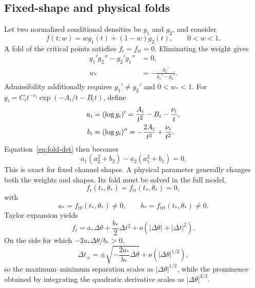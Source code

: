 \documentclass[aps,pre,reprint,amsmath,amssymb,longbibliography,floatfix]{revtex4-2}
\begin{document}
\subsection{Fixed-shape and physical folds}
\label{sec:fold}

Let two normalized conditional densities be \(g_1\) and \(g_2\), and consider
\begin{equation}
f(t;w)=w g_1(t)+(1-w)g_2(t),\qquad 0<w<1.
\label{eq:mixture}
\end{equation}
A fold of the critical points satisfies \(f_t=f_{tt}=0\). Eliminating the
weight gives
\begin{align}
g_1'g_2''-g_2'g_1''&=0,
\label{eq:fold-det}\\
w_*&=-\frac{g_2'}{g_1'-g_2'}.
\label{eq:fold-weight}
\end{align}
Admissibility additionally requires \(g_1'\ne g_2'\) and \(0<w_*<1\).
For \(g_i=C_it^{-\nu_i}\exp(-A_i/t-B_it)\), define
\begin{align}
a_i&=(\log g_i)'=\frac{A_i}{t^2}-B_i-\frac{\nu_i}{t},\notag\\
b_i&=(\log g_i)''=-\frac{2A_i}{t^3}+\frac{\nu_i}{t^2}.
\label{eq:gig-log-derivatives}
\end{align}
Equation~\eqref{eq:fold-det} then becomes
\begin{equation}
a_1(a_2^2+b_2)-a_2(a_1^2+b_1)=0.
\label{eq:gig-fold}
\end{equation}
This is exact for fixed channel shapes. A physical parameter generally
changes both the weights and shapes. Its fold must be solved in the full
model,
\begin{equation}
f_t(t_*,\theta_*)=f_{tt}(t_*,\theta_*)=0,
\label{eq:physical-fold}
\end{equation}
with
\begin{equation}
a_*=f_{t\theta}(t_*,\theta_*)\ne0,\qquad
b_*=f_{ttt}(t_*,\theta_*)\ne0.
\label{eq:fold-nondegenerate}
\end{equation}
Taylor expansion yields
\begin{equation}
f_t=a_*\Delta\theta+\frac{b_*}{2}\Delta t^2
+o(|\Delta\theta|+|\Delta t|^2).
\label{eq:fold-normal}
\end{equation}
On the side for which \(-2a_*\Delta\theta/b_*>0\),
\begin{equation}
\Delta t_\pm=
\pm\sqrt{-\frac{2a_*}{b_*}\Delta\theta}
+o(|\Delta\theta|^{1/2}),
\label{eq:fold-roots}
\end{equation}
so the maximum--minimum separation scales as
\(|\Delta\theta|^{1/2}\), while the prominence obtained by integrating the
quadratic derivative scales as \(|\Delta\theta|^{3/2}\).
\end{document}
